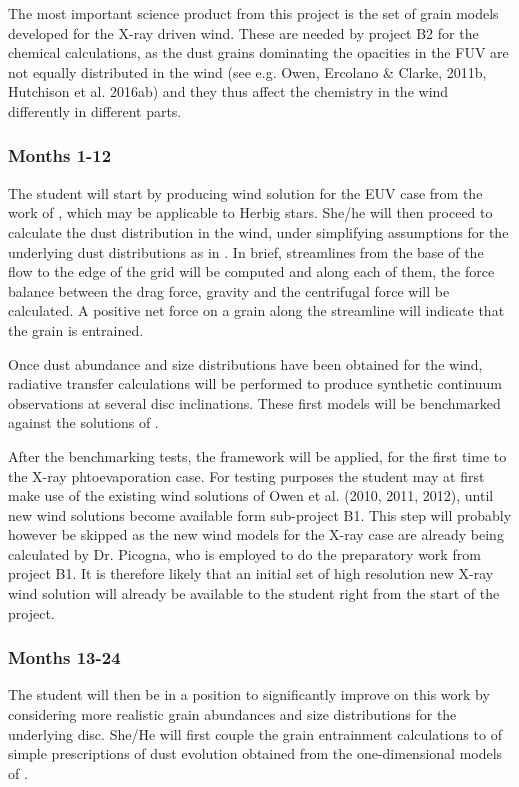 \documentclass[10pt,fleqn,twoside]{article}
\begin{document}
The most important science product from this project is the set of
grain models developed for the  X-ray driven wind. These are needed by
project B2 for the chemical calculations, as the dust
grains dominating the opacities in the FUV are not equally distributed
in the wind (see e.g. Owen, Ercolano \& Clarke, 2011b, Hutchison et
al. 2016ab) and they thus affect the chemistry in the wind
differently in different parts. 

\subsubsection{Months 1-12}
The student will start by producing wind solution for the EUV case
from the work of \citet{2004ApJ...607..890F}, which may be applicable
to Herbig stars. She/he will then proceed to calculate the dust
distribution in the wind, under simplifying assumptions for the
underlying dust distributions as in \citet{2011MNRAS.411.1104O}. In
brief, streamlines from the base of the flow to the edge of the grid
will be computed and along each of them, the force balance between the
drag force, gravity and the centrifugal force will be calculated. A
positive net force on a grain along the streamline will indicate that
the grain is entrained.

Once dust abundance and size distributions have been obtained for the
wind, radiative transfer calculations will be performed to produce
synthetic continuum observations at several disc inclinations. 
These first models will be benchmarked against the solutions
of \citet{2011MNRAS.411.1104O}.

After the benchmarking tests, the framework will be applied, for the
first time to the X-ray phtoevaporation case. For testing purposes the student may at first make use of the
existing wind solutions of Owen et al. (2010, 2011, 2012), until new
wind solutions become available form sub-project B1. This step will
probably however be skipped as the new wind models for the X-ray case
are already being calculated by Dr. Picogna, who is employed to do the
preparatory work from project B1. It is therefore likely that an
initial set of high resolution new X-ray wind solution will already be
available to the student right from the start of the project.
 

\subsubsection{Months 13-24}
The student will then be in a position to significantly improve on
this work by considering more realistic grain abundances and size
distributions for the underlying disc. She/He will first couple the
grain entrainment calculations to of simple prescriptions of dust
evolution \citep[e.g.,][]{2012A&A...539A.148B} obtained from the
one-dimensional models of \citet{2010A&A...513A..79B}.
\end{document}
